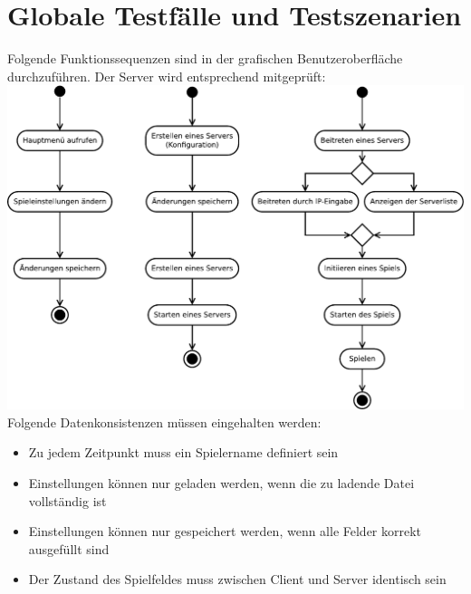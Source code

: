 \documentclass[a4paper,10pt]{article}
\begin{document}
\section{Globale Testfälle und Testszenarien}
Folgende Funktionssequenzen sind in der grafischen Benutzeroberfläche durchzuführen. Der Server wird entsprechend mitgeprüft: \\
\includegraphics[width=17cm]{Diagram1} \\
Folgende Datenkonsistenzen müssen eingehalten werden:
\begin{itemize}
\item Zu jedem Zeitpunkt muss ein Spielername definiert sein
\item Einstellungen können nur geladen werden, wenn die zu ladende Datei vollständig ist
\item Einstellungen können nur gespeichert werden, wenn alle Felder korrekt ausgefüllt sind
\item Der Zustand des Spielfeldes muss zwischen Client und Server identisch sein
\end{itemize}
\end{document}
